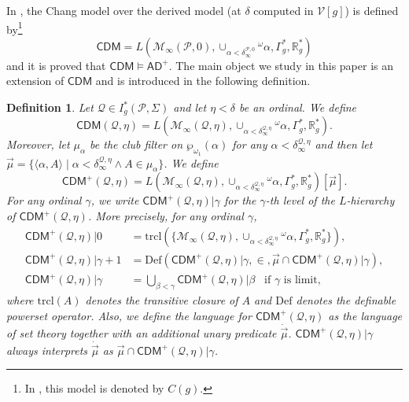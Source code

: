 \documentclass{amsart}
\newtheorem{dfn}{Definition}[section]
\newcommand{\power}{\wp}
\begin{document}
In \cite{CoveringChang}, the Chang model over the derived model (at $\delta$ computed in $\mathcal{V}[g]$) is defined by\footnote{In \cite{CoveringChang}, this model is denoted by $C(g)$.}
\[
\mathsf{CDM}=L(\mathcal{M}_{\infty}(\mathcal{P}, 0), \cup_{\alpha<\delta^{\mathcal{P}, 0}_{\infty}}{}^{\omega}\alpha, \Gamma^*_g, \mathbb{R}^*_g)
\]
and it is proved that $\mathsf{CDM}\models\mathsf{AD}^+$.
The main object we study in this paper is an extension of $\mathsf{CDM}$ and is introduced in the following definition.

\begin{dfn}\label{def_of_CDM_plus}
Let $\mathcal{Q}\in I^*_{g}(\mathcal{P}, \Sigma)$ and let $\eta<\delta$ be an ordinal.
We define
\[
\mathsf{CDM}(\mathcal{Q}, \eta)=L(\mathcal{M}_{\infty}(\mathcal{Q}, \eta), \cup_{\alpha<\delta^{\mathcal{Q}, \eta}_{\infty}}{}^{\omega}\alpha, \Gamma^*_g, \mathbb{R}^*_g).
\]
Moreover, let $\mu_{\alpha}$ be the club filter on $\power_{\omega_1}(\alpha)$ for any $\alpha<\delta^{\mathcal{Q}, \eta}_{\infty}$ and then let $\vec{\mu}=\{\langle\alpha, A\rangle\mid\alpha<\delta^{\mathcal{Q}, \eta}_{\infty}\land A\in\mu_{\alpha}\}$.
We define 
\[
\mathsf{CDM}^{+}(\mathcal{Q}, \eta)=L(\mathcal{M}_{\infty}(\mathcal{Q}, \eta), \cup_{\alpha<\delta^{\mathcal{Q}, \eta}_{\infty}}{}^{\omega}\alpha, \Gamma^*_g, \mathbb{R}^*_g)[\vec{\mu}].
\]
For any ordinal $\gamma$, we write $\mathsf{CDM}^{+}(\mathcal{Q}, \eta)\vert\gamma$ for the $\gamma$-th level of the $L$-hierarchy of $\mathsf{CDM}^+(\mathcal{Q}, \eta)$.
More precisely, for any ordinal $\gamma$,
\begin{align*}
    \mathsf{CDM}^+(\mathcal{Q}, \eta)\vert 0 &= \mathrm{trcl}(\{\mathcal{M}_{\infty}(\mathcal{Q}, \eta), \cup_{\alpha<\delta^{\mathcal{Q}, \eta}_{\infty}}{}^{\omega}\alpha, \Gamma^*_g, \mathbb{R}^*_g\}),\\
    \mathsf{CDM}^+(\mathcal{Q}, \eta)\vert\gamma+1 &= \mathrm{Def}(\mathsf{CDM}^+(\mathcal{Q}, \eta)\vert\gamma, {\in}, \vec{\mu}\cap\mathsf{CDM}^+(\mathcal{Q}, \eta)\vert\gamma),\\
    \mathsf{CDM}^+(\mathcal{Q}, \eta)\vert\gamma &= \bigcup_{\beta<\gamma}\mathsf{CDM}^+(\mathcal{Q}, \eta)\vert\beta\;\;\;\text{if $\gamma$ is limit},
\end{align*}
where $\mathrm{trcl}(A)$ denotes the transitive closure of $A$ and $\mathrm{Def}$ denotes the definable powerset operator.
Also, we define the language for $\mathsf{CDM}^+(\mathcal{Q}, \eta)$ as the language of set theory together with an additional unary predicate $\dot{\vec{\mu}}$.
$\mathsf{CDM}^+(\mathcal{Q}, \eta)\vert\gamma$ always interprets $\dot{\vec{\mu}}$ as $\vec{\mu}\cap\mathsf{CDM}^+(\mathcal{Q}, \eta)\vert\gamma$.
\end{dfn}
\end{document}
